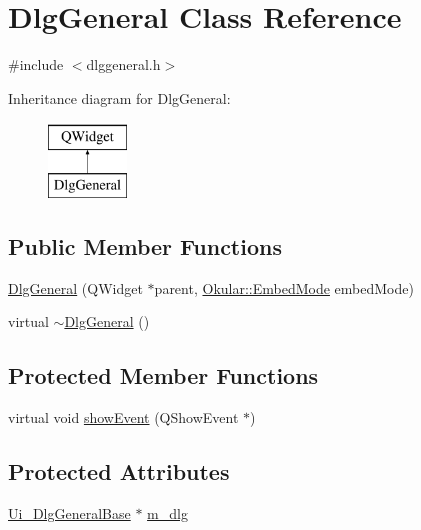 \hypertarget{classDlgGeneral}{\section{Dlg\+General Class Reference}
\label{classDlgGeneral}
}


{\ttfamily \#include $<$dlggeneral.\+h$>$}

Inheritance diagram for Dlg\+General\+:\begin{figure}[H]
\begin{center}
\leavevmode
\includegraphics[height=2.000000cm]{classDlgGeneral}
\end{center}
\end{figure}
\subsection*{Public Member Functions}
\begin{DoxyCompactItemize}
\item 
\hyperlink{classDlgGeneral_a6b76699c5118f535a51c89464aebca02}{Dlg\+General} (Q\+Widget $\ast$parent, \hyperlink{namespaceOkular_adbe21e337d65d3f5f07a441180428ba8}{Okular\+::\+Embed\+Mode} embed\+Mode)
\item 
virtual \hyperlink{classDlgGeneral_ae3733151f7e8fe39c17a42183416975a}{$\sim$\+Dlg\+General} ()
\end{DoxyCompactItemize}
\subsection*{Protected Member Functions}
\begin{DoxyCompactItemize}
\item 
virtual void \hyperlink{classDlgGeneral_a5318f904f1e55564f505302e14bf670d}{show\+Event} (Q\+Show\+Event $\ast$)
\end{DoxyCompactItemize}
\subsection*{Protected Attributes}
\begin{DoxyCompactItemize}
\item 
\hyperlink{classUi__DlgGeneralBase}{Ui\+\_\+\+Dlg\+General\+Base} $\ast$ \hyperlink{classDlgGeneral_ac33f78ba1135a2175517ec066115b32c}{m\+\_\+dlg}
\end{DoxyCompactItemize}


